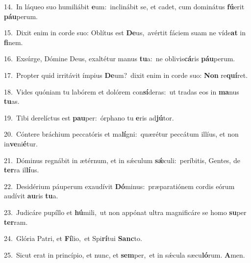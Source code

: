 {\numbfont\textcolor{\numbcolor}{14.}}~In láqueo suo humiliábit \textbf{e}\-um:~\star inclinábit se, et cadet, cum dominátus \textbf{fú}\-erit \textbf{páu}\-perum.\par
{\numbfont\textcolor{\numbcolor}{15.}}~Dixit enim in corde suo: Oblítus est \textbf{De}\-us,~\star avértit fáciem suam ne víde\textbf{at} in \textbf{fi}\-nem.\par
{\numbfont\textcolor{\numbcolor}{16.}}~Exsúrge, Dómine Deus, exaltétur manus \textbf{tu}\-a:~\star ne oblivis\-\textbf{cá}\-ris \textbf{páu}\-perum.\par
{\numbfont\textcolor{\numbcolor}{17.}}~Propter quid irritávit ímpius \textbf{De}\-um?~\star dixit enim in corde suo: \textbf{Non} re\-\textbf{quí}\-ret.\par
{\numbfont\textcolor{\numbcolor}{18.}}~Vides quóniam tu labórem et dolórem con\-\textbf{sí}\-deras:~\star ut tradas eos in \textbf{ma}\-nus \textbf{tu}\-as.\par
{\numbfont\textcolor{\numbcolor}{19.}}~Tibi derelíctus est \textbf{pau}\-per:~\star órphano tu \textbf{e}\-ris ad\-\textbf{jú}\-tor.\par
{\numbfont\textcolor{\numbcolor}{20.}}~Cóntere bráchium peccatóris et ma\-\textbf{lí}\-gni:~\star quærétur peccátum illíus, et non in\-\textbf{ve}\-ni\-\textbf{é}\-tur.\par
{\numbfont\textcolor{\numbcolor}{21.}}~Dóminus regnábit in ætérnum, et in sǽculum \textbf{sǽ}\-culi:~\star períbitis, Gentes, de \textbf{ter}\-ra il\-\textbf{lí}\-us.\par
{\numbfont\textcolor{\numbcolor}{22.}}~Desidérium páuperum exaudívit \textbf{Dó}\-minus:~\star præparatiónem cordis eórum audívit \textbf{au}\-ris \textbf{tu}\-a.\par
{\numbfont\textcolor{\numbcolor}{23.}}~Judicáre pupíllo et \textbf{hú}\-mili,~\star ut non appónat ultra magnificáre se homo \textbf{su}\-per \textbf{ter}\-ram.\par
{\numbfont\textcolor{\numbcolor}{24.}}~Glória Patri, et \textbf{Fí}\-lio,~\star et Spi\-\textbf{rí}\-tui \textbf{Sanc}\-to.\par
{\numbfont\textcolor{\numbcolor}{25.}}~Sicut erat in princípio, et nunc, et \textbf{sem}\-per,~\star et in sǽcula sæcu\-\textbf{ló}\-rum. \textbf{A}\-men.\par
